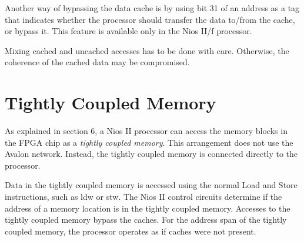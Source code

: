 \documentclass[11pt, twoside, pdftex]{article}
\newcommand{\commonPath}{../../Common}
\begin{document}
Another way of bypassing the data cache is by using bit 31 of an address as a tag that
indicates whether the processor should transfer the data to/from the cache, or bypass it.
This feature is available only in the Nios II/f processor. 

Mixing cached and uncached accesses has to be done with care. Otherwise, the coherence of
the cached data may be compromised.

\section{Tightly Coupled Memory}

As explained in section 6, a Nios II processor can access the memory blocks in the FPGA
chip as a {\it tightly coupled memory}. This arrangement does not use the Avalon network. 
Instead, the tightly coupled memory is connected directly to the processor.

Data in the tightly coupled memory is accessed using the normal Load and Store instructions,
such as {\sf ldw} or {\sf stw}. The Nios II control circuits determine if the address of a
memory location is in the tightly coupled memory. Accesses to the tightly coupled memory
bypass the caches. For the address span of the tightly coupled memory, the processor
operates as if caches were not present.




\end{document}
